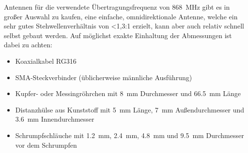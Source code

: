\documentclass[paper=a4, parskip, numbers=noenddot, toc=listof, headsepline]{scrbook}
\begin{document}
			Antennen für die verwendete Übertragungsfrequenz von \SI{868}{\mega\hertz} gibt es in großer Auswahl zu kaufen, eine einfache, omnidirektionale Antenne, welche ein sehr gutes Stehwellenverhältnis von <1,3:1 erzielt, kann aber auch relativ schnell selbst gebaut werden. Auf möglichst exakte Einhaltung der Abmessungen ist dabei zu achten:
			\begin{itemize}
				\item
				      Koaxialkabel RG316
				\item
				      SMA-Steckverbinder (üblicherweise männliche Ausführung)
				\item
				      Kupfer- oder Messingröhrchen mit \SI{8}{\milli\metre} Durchmesser und \SI{66,5}{\milli\metre} Länge
				\item
				      Distanzhülse aus Kunststoff mit \SI{5}{\milli\metre} Länge, \SI{7}{\milli\metre} Außendurchmesser und \SI{3,6}{\milli\metre} Innendurchmesser
				\item
				      Schrumpfschläuche mit \SI{1,2}{\milli\metre}, \SI{2,4}{\milli\metre}, \SI{4,8}{\milli\metre} und \SI{9,5}{\milli\metre} Durchmesser vor dem Schrumpfen
			\end{itemize}
\end{document}
